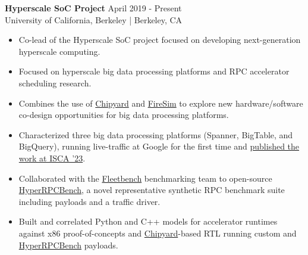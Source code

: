 \documentclass[line]{res}
\begin{document}
\begin{resume}
\label{sec:hyperscale-soc}
\textbf{Hyperscale SoC Project} \hfill April 2019 - Present
\\
University of California, Berkeley | Berkeley, CA
\\
\vspace{-3mm}
\begin{itemize}
\item Co-lead of the Hyperscale SoC project focused on developing next-generation hyperscale computing.
\item Focused on hyperscale big data processing platforms and RPC accelerator scheduling research.
\item Combines the use of \hyperref[sec:chipyard]{Chipyard} and \hyperref[sec:firesim]{FireSim} to explore new hardware/software co-design opportunities for big data processing platforms.
\item Characterized three big data processing platforms (Spanner, BigTable, and BigQuery), running live-traffic at Google for the first time and \hyperref[sec:iscapaper]{published the work at ISCA '23}.
\item Collaborated with the \href{https://github.com/google/fleetbench}{Fleetbench} benchmarking team to open-source \href{https://github.com/google/fleetbench/tree/cd20746b68b307b148a761c676d6400f2541082d/fleetbench/rpc}{HyperRPCBench}, a novel representative synthetic RPC benchmark suite including payloads and a traffic driver.
\item Built and correlated Python and C++ models for accelerator runtimes against x86 proof-of-concepts and \hyperref[sec:chipyard]{Chipyard}-based RTL running custom and \href{https://github.com/google/fleetbench/tree/cd20746b68b307b148a761c676d6400f2541082d/fleetbench/rpc}{HyperRPCBench} payloads.
\end{itemize}

\vspace{-2mm}


\end{resume}
\end{document}
